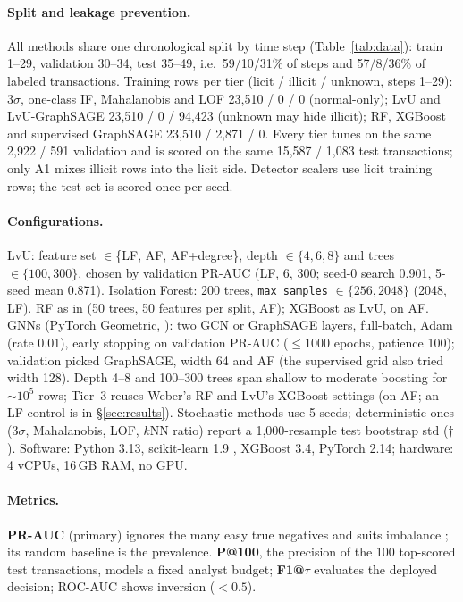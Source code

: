 \documentclass[11pt]{article}
\newcommand{\ours}{LvU}
\begin{document}
\paragraph{Split and leakage prevention.}
All methods share one chronological split by time step (Table~\ref{tab:data}): train 1--29, validation 30--34, test 35--49, i.e.\ 59/10/31\% of steps and 57/8/36\% of labeled transactions.
Training rows per tier (licit / illicit / unknown, steps 1--29): 3$\sigma$, one-class IF, Mahalanobis and LOF 23,510 / 0 / 0 (normal-only); \ours{} and LvU-GraphSAGE 23,510 / 0 / 94,423 (unknown may hide illicit); RF, XGBoost and supervised GraphSAGE 23,510 / 2,871 / 0.
Every tier tunes on the same 2,922 / 591 validation and is scored on the same 15,587 / 1,083 test transactions; only A1 mixes illicit rows into the licit side.
Detector scalers use licit training rows; the test set is scored once per seed.

\paragraph{Configurations.}
\ours{}: feature set $\in$\{LF, AF, AF+degree\}, depth $\in\{4,6,8\}$ and trees $\in\{100,300\}$, chosen by validation PR-AUC (LF, 6, 300; seed-0 search 0.901, 5-seed mean 0.871).
Isolation Forest: 200 trees, \texttt{max\_samples} $\in\{256,2048\}$ (2048, LF).
RF as in \citet{weber2019aml} (50 trees, 50 features per split, AF); XGBoost as \ours{}, on AF.
GNNs (PyTorch Geometric, \citealp{fey2019pyg}): two GCN or GraphSAGE layers, full-batch, Adam (rate 0.01), early stopping on validation PR-AUC (${\le}$1000 epochs, patience 100); validation picked GraphSAGE, width 64 and AF (the supervised grid also tried width 128).
Depth 4--8 and 100--300 trees span shallow to moderate boosting for ${\sim}10^5$ rows; Tier~3 reuses Weber's RF and \ours{}'s XGBoost settings (on AF; an LF control is in \S\ref{sec:results}).
Stochastic methods use 5 seeds; deterministic ones (3$\sigma$, Mahalanobis, LOF, $k$NN ratio) report a 1,000-resample test bootstrap std ($\dagger$). Software: Python 3.13, scikit-learn 1.9 \citep{pedregosa2011sklearn}, XGBoost 3.4, PyTorch 2.14; hardware: 4 vCPUs, 16\,GB RAM, no GPU.

\paragraph{Metrics.}
\textbf{PR-AUC} (primary) ignores the many easy true negatives and suits imbalance \citep{saito2015prc}; its random baseline is the prevalence.
\textbf{P@100}, the precision of the 100 top-scored test transactions, models a fixed analyst budget; \textbf{F1@$\tau$} evaluates the deployed decision; ROC-AUC shows inversion ($<0.5$).
\end{document}
